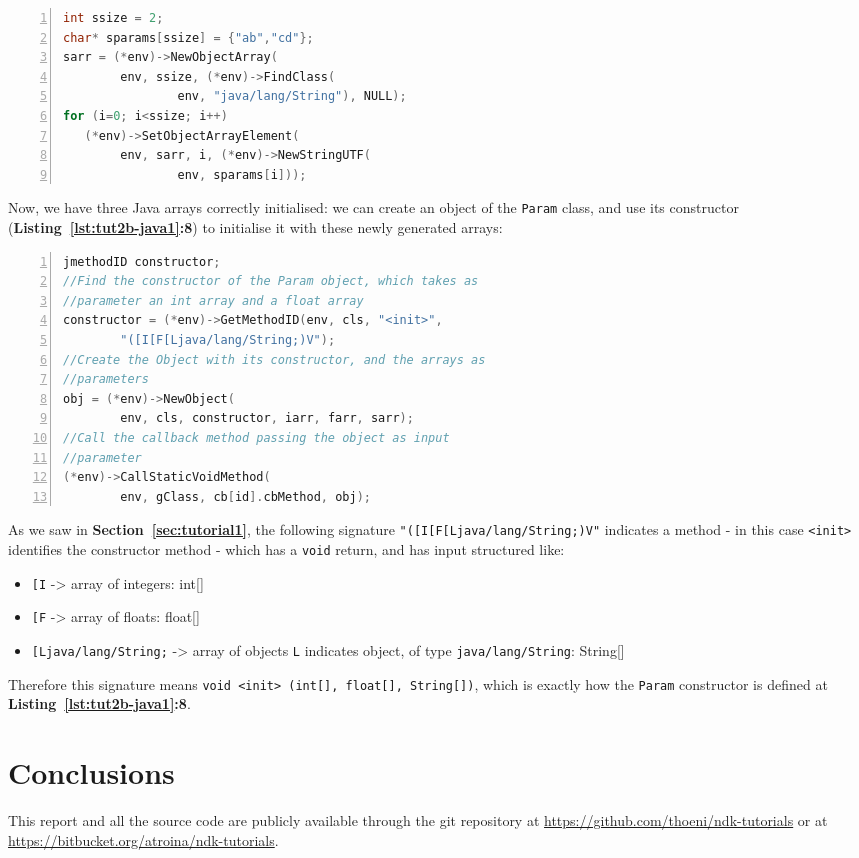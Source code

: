 \documentclass[a4paper,10pt]{article}
\newcommand{\keyword}[1]{\texttt{#1}}
\newcommand{\refl}[1]{\textbf{Listing~\ref{#1}}}
\newcommand{\refs}[1]{\textbf{Section~\ref{#1}}}
\begin{document}
\begin{multicols}{2}
\begin{lstlisting}[language=C,
				   columns=fullflexible,
				   showstringspaces=false,
				   xleftmargin=15pt,
				   frame = l,
				   numbers=left,
				   commentstyle=\color{gray}\upshape]
int ssize = 2;
char* sparams[ssize] = {"ab","cd"};
sarr = (*env)->NewObjectArray(
		env, ssize, (*env)->FindClass(
				env, "java/lang/String"), NULL);
for (i=0; i<ssize; i++)
   (*env)->SetObjectArrayElement(
   		env, sarr, i, (*env)->NewStringUTF(
   				env, sparams[i]));
\end{lstlisting}
Now, we have three Java arrays correctly initialised: we can create an object of the \keyword{Param} class, and use its constructor (\refl{lst:tut2b-java1}\textbf{:8}) to initialise it with these newly generated arrays:
\begin{lstlisting}[language=C,
				   columns=fullflexible,
				   showstringspaces=false,
				   xleftmargin=15pt,
				   frame = l,
				   numbers=left,
				   commentstyle=\color{gray}\upshape]
jmethodID constructor;
//Find the constructor of the Param object, which takes as
//parameter an int array and a float array
constructor = (*env)->GetMethodID(env, cls, "<init>",
		"([I[F[Ljava/lang/String;)V");
//Create the Object with its constructor, and the arrays as
//parameters
obj = (*env)->NewObject(
		env, cls, constructor, iarr, farr, sarr);
//Call the callback method passing the object as input
//parameter
(*env)->CallStaticVoidMethod(
		env, gClass, cb[id].cbMethod, obj);
\end{lstlisting}
As we saw in \refs{sec:tutorial1}, the following signature \keyword{"([I[F[Ljava/lang/String;)V"} indicates a method - in this case \keyword{<init>} identifies the constructor method - which has a \keyword{void} return, and has input structured like:
\begin{itemize}
\item \keyword{[I} -> array of integers: int[]
\item \keyword{[F} -> array of floats: float[]
\item \keyword{[Ljava/lang/String;} -> array of objects \keyword{L} indicates object, of type \keyword{java/lang/String}: String[]
\end{itemize}
Therefore this signature means \keyword{void <init> (int[], float[], String[])}, which is exactly how the \keyword{Param} constructor is defined at \refl{lst:tut2b-java1}\textbf{:8}.

\section{Conclusions}

This report and all the source code are publicly available through the git
repository at \url{https://github.com/thoeni/ndk-tutorials} or at \url{https://bitbucket.org/atroina/ndk-tutorials}.


\end{multicols}
\end{document}
